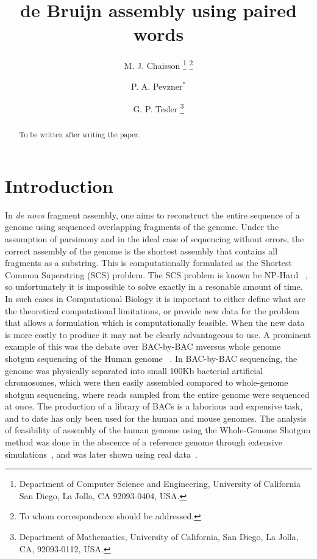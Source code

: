 \documentclass{article}
\begin{document}
\title{de Bruijn assembly using paired words}
\author{M. J. Chaisson \thanks{Department of Computer Science and
    Engineering, University of California San Diego, La Jolla, CA 92093-0404, USA.} 
\thanks{To whom correspondence should be addressed.}
\and P. A. Pevzner$^\ast$
\and G. P. Tesler
\thanks{Department of Mathematics, University of California, San Diego,
La Jolla, CA, 92093-0112, USA.}
}

\maketitle{}

\begin{abstract}
  To be written after writing the paper.
\end{abstract}

\section{Introduction}
  
In \textit{de novo} fragment assembly, one aims to reconstruct the
entire sequence of a genome using sequenced overlapping fragments of
the genome.  Under the assumption of parsimony and in the ideal case
of sequencing without errors, the correct assembly of the genome is
the shortest assembly that contains all fragments as a substring.
This is computationally formulated as the Shortest Common Superstring
(SCS) problem.  The SCS problem is known be NP-Hard
~\cite{Storer1980}, so unfortunately it is impossible to solve exactly
in a resonable amount of time.  In such cases in Computational Biology
it is important to either define what are the theoretical
computational limitations, or provide new data for the problem that
allows a formulation which is computationally feasible.  When the new
data is more costly to produce it may not be clearly advantageous to
use.  A prominent example of this was the debate over BAC-by-BAC
mversus whole genome shotgun sequencing of the Human genome
~\cite{Green1997, Myers1997}.  In BAC-by-BAC sequencing, the genome
was physically separated into small 100Kb bacterial artificial
chromosomes, which were then easily assembled compared to whole-genome
shotgun sequencing, where reads sampled from the entire genome were
sequenced at once.  The production of a library of BACs is a laborious
and expensive task, and to date has only been used for the human and
mouse genomes.  The analysis of feasibility of assembly of the human
genome using the Whole-Genome Shotgun method was done in the abscence
of a reference genome through extensive simulations~\cite{Myers1997},
and was later shown using real data~\cite{HumanGenomeVenter}.
\end{document}
